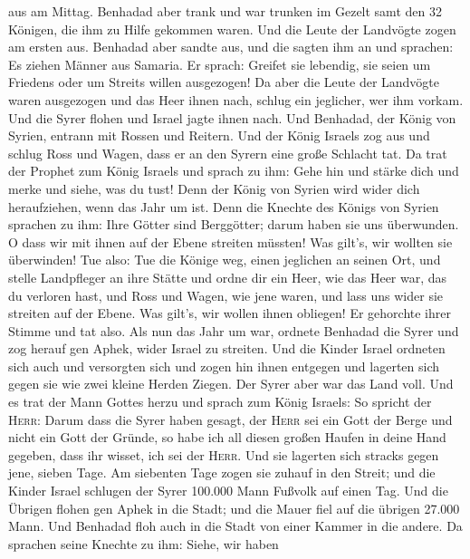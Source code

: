 aus am Mittag. Benhadad aber trank und war trunken im Gezelt samt den 32
Königen, die ihm zu Hilfe gekommen waren.  Und die Leute
der Landvögte zogen am ersten aus. Benhadad aber sandte aus, und die
sagten ihm an und sprachen: Es ziehen Männer aus Samaria.
 Er sprach: Greifet sie lebendig, sie seien um Friedens
oder um Streits willen ausgezogen!  Da aber die Leute der
Landvögte waren ausgezogen und das Heer ihnen nach, 
schlug ein jeglicher, wer ihm vorkam. Und die Syrer flohen und Israel
jagte ihnen nach. Und Benhadad, der König von Syrien, entrann mit Rossen
und Reitern.  Und der König Israels zog aus und schlug
Ross und Wagen, dass er an den Syrern eine große Schlacht tat.
 Da trat der Prophet zum König Israels und sprach zu ihm:
Gehe hin und stärke dich und merke und siehe, was du tust! Denn der
König von Syrien wird wider dich heraufziehen, wenn das Jahr um ist.
 Denn die Knechte des Königs von Syrien sprachen zu ihm:
Ihre Götter sind Berggötter; darum haben sie uns überwunden. O dass wir
mit ihnen auf der Ebene streiten müssten! Was gilt's, wir wollten sie
überwinden!  Tue also: Tue die Könige weg, einen
jeglichen an seinen Ort, und stelle Landpfleger an ihre Stätte
 und ordne dir ein Heer, wie das Heer war, das du
verloren hast, und Ross und Wagen, wie jene waren, und lass uns wider
sie streiten auf der Ebene. Was gilt's, wir wollen ihnen obliegen! Er
gehorchte ihrer Stimme und tat also.  Als nun das Jahr um
war, ordnete Benhadad die Syrer und zog herauf gen Aphek, wider Israel
zu streiten.  Und die Kinder Israel ordneten sich auch
und versorgten sich und zogen hin ihnen entgegen und lagerten sich gegen
sie wie zwei kleine Herden Ziegen. Der Syrer aber war das Land voll.
 Und es trat der Mann Gottes herzu und sprach zum König
Israels: So spricht der \textsc{Herr}: Darum dass die Syrer haben
gesagt, der \textsc{Herr} sei ein Gott der Berge und nicht ein Gott der
Gründe, so habe ich all diesen großen Haufen in deine Hand gegeben, dass
ihr wisset, ich sei der \textsc{Herr}.  Und sie lagerten
sich stracks gegen jene, sieben Tage. Am siebenten Tage zogen sie zuhauf
in den Streit; und die Kinder Israel schlugen der Syrer 100.000 Mann
Fußvolk auf einen Tag.  Und die Übrigen flohen gen Aphek
in die Stadt; und die Mauer fiel auf die übrigen 27.000 Mann. Und
Benhadad floh auch in die Stadt von einer Kammer in die andere.
 Da sprachen seine Knechte zu ihm: Siehe, wir haben
